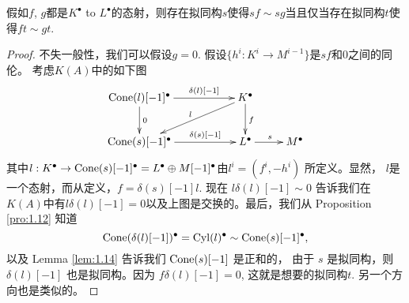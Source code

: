 \begin{lem}\label{lem:1.22}
    假如$f$, $g$都是$K^\bullet$ to $L^\bullet$的态射，则存在拟同构$s$使得$sf\sim sg$当且仅当存在拟同构$t$使得$ft\sim gt$.
\end{lem}

\begin{proof}
	不失一般性，我们可以假设$g=0$. 假设$\{h^i:K^i\to M^{i-1}\}$是$sf$和$0$之间的同伦。
    考虑$K(A)$中的如下图
	\[
		\xymatrix{
\Cone(l)[-1]^\bullet \ar@{->}[rr]^-{\delta(l)[-1]}\ar[d]^0 && K^\bullet \ar@{->}[d]^{f} \ar@{->}[lld]_{l} &  \\
\Cone(s)[-1]^\bullet \ar@{->}[rr]^-{{\delta(s)[-1]}} && L^\bullet \ar@{->}[r]^{s} & M^\bullet
}
	\]
	其中$l:K^\bullet \to \operatorname{Cone}(s)[-1]^\bullet=L^\bullet \oplus M[-1]^\bullet$由$l^i=(f^i,-h^i)$
    所定义。显然， $l$是一个态射，而从定义，$f=\delta(s)[-1]l$. 现在 $l\delta(l)[-1]\sim 0$ 
    告诉我们在$K(A)$中有$l\delta(l)[-1] = 0$以及上图是交换的。最后，我们从
    Proposition \ref{pro:1.12} 知道
	\[
		\operatorname{Cone}(\delta(l)[-1])^\bullet=\operatorname{Cyl}(l)^\bullet \sim \operatorname{Cone}(s)[-1]^\bullet,
	\]
	以及  Lemma \ref{lem:1.14} 告诉我们 $\operatorname{Cone}(s)[-1]$ 是正和的，
    由于 $s$ 是拟同构，则 $\delta(l)[-1]$ 也是拟同构。因为 $f\delta(l)[-1]=0$,
    这就是想要的拟同构$t$. 另一个方向也是类似的。
\end{proof}

